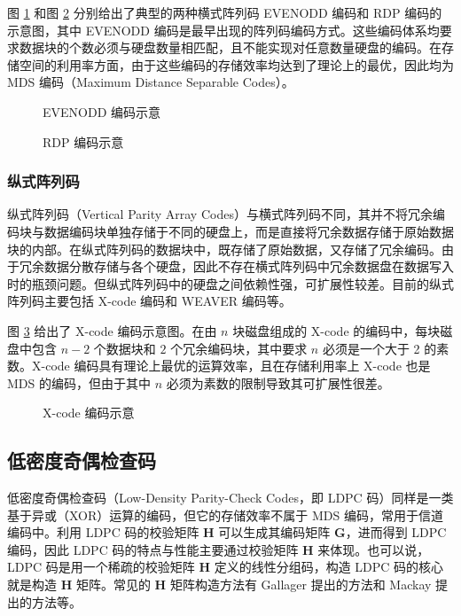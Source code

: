 图 \ref{p10} 和图 \ref{p11} 分别给出了典型的两种横式阵列码 EVENODD 编码和 RDP 编码的示意图\cite{xiang2011hybrid}，其中 EVENODD 编码是最早出现的阵列码编码方式。这些编码体系均要求数据块的个数必须与硬盘数量相匹配，且不能实现对任意数量硬盘的编码。在存储空间的利用率方面，由于这些编码的存储效率均达到了理论上的最优，因此均为 MDS 编码（Maximum Distance Separable Codes）。

\begin{figure}[!htb]
\centering
\resizebox{.8\textwidth}{!}{}
\caption{EVENODD 编码示意}
\label{p10}
\end{figure}

\begin{figure}[!htb]
\centering
\resizebox{.8\textwidth}{!}{}
\caption{RDP 编码示意}
\label{p11}
\end{figure}
\subsubsection{纵式阵列码}
纵式阵列码（Vertical Parity Array Codes）与横式阵列码不同，其并不将冗余编码块与数据编码块单独存储于不同的硬盘上，而是直接将冗余数据存储于原始数据块的内部。在纵式阵列码的数据块中，既存储了原始数据，又存储了冗余编码。由于冗余数据分散存储与各个硬盘，因此不存在横式阵列码中冗余数据盘在数据写入时的瓶颈问题。但纵式阵列码中的硬盘之间依赖性强，可扩展性较差。目前的纵式阵列码主要包括 X-code 编码\cite{xu1999x}和 WEAVER 编码\cite{hafner2005weaver}等。

图 \ref{p12} 给出了 X-code 编码示意图\cite{shen2015hv}。在由 $n$ 块磁盘组成的 X-code 的编码中，每块磁盘中包含 $n-2$ 个数据块和 $2$ 个冗余编码块，其中要求 $n$ 必须是一个大于 2 的素数。X-code 编码具有理论上最优的运算效率，且在存储利用率上 X-code 也是 MDS 的编码，但由于其中 $n$ 必须为素数的限制导致其可扩展性很差。

\begin{figure}[!htb]
\centering
\resizebox{.8\textwidth}{!}{}
\caption{X-code 编码示意}
\label{p12}
\end{figure}
\subsection{低密度奇偶检查码}
低密度奇偶检查码（Low-Density Parity-Check Codes，即 LDPC 码）\cite{gallager1962low}同样是一类基于异或（XOR）运算的编码，但它的存储效率不属于 MDS 编码，常用于信道编码中\cite{kumar2018detailed}。利用 LDPC 码的校验矩阵 $\boldsymbol{H}$ 可以生成其编码矩阵 $\boldsymbol{G}$，进而得到 LDPC 编码，因此 LDPC 码的特点与性能主要通过校验矩阵 $\boldsymbol{H}$ 来体现。也可以说，LDPC 码是用一个稀疏的校验矩阵 $\boldsymbol{H}$ 定义的线性分组码，构造 LDPC 码的核心就是构造 $\boldsymbol{H}$ 矩阵。常见的 $\boldsymbol{H}$ 矩阵构造方法有 Gallager 提出的方法\cite{gallager1962low}和 Mackay 提出的方法\cite{mackay1997near}等。

